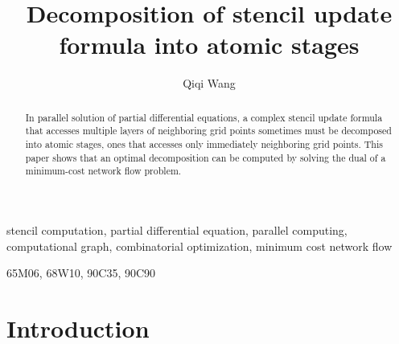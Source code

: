 \documentclass[review]{siamart0216}
\title{Decomposition of stencil update formula into atomic stages}
\author{Qiqi Wang}
\begin{document}
\maketitle

\begin{abstract}
    In parallel solution of partial differential equations,
    a complex stencil update formula
    that accesses multiple layers of neighboring grid points
    sometimes must be decomposed into atomic stages, ones that accesses
    only immediately neighboring grid points.
    This paper shows that an optimal decomposition can be computed by
    solving the dual of a minimum-cost network flow problem.
\end{abstract}

\begin{keywords}
  stencil computation, partial differential equation, parallel computing,
  computational graph, combinatorial optimization, minimum cost network flow
\end{keywords}

\begin{AMS}
  65M06, 68W10, 90C35, 90C90
\end{AMS}

\section{Introduction}

\end{document}
